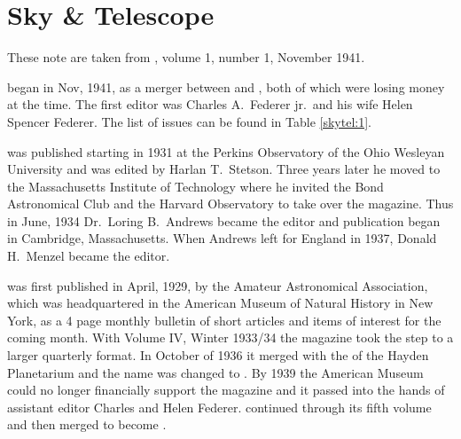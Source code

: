 \section{Sky \& Telescope}

These note are taken from , volume 1, number 1,
November 1941.

 began in Nov, 1941, as a merger between  and , both of which were losing money at the
time.  The first editor was Charles A.~Federer jr.\ and his wife Helen
Spencer Federer. The list of issues can be found in Table \ref{skytel:1}.

 was published starting in 1931 at
the Perkins Observatory of the Ohio Wesleyan University and was edited
by Harlan T.~Stetson. Three years later he moved to the Massachusetts
Institute of Technology where he invited the Bond Astronomical Club and
the Harvard Observatory to take over the magazine. Thus in June, 1934
Dr.~Loring B.~Andrews became the editor and publication began in Cambridge,
Massachusetts.  When Andrews left for England in 1937, Donald H.~Menzel
became the editor.

 was first published in April, 1929, by the
Amateur Astronomical Association, which was headquartered in the American
Museum of Natural History in New York, as a 4 page monthly bulletin of
short articles and items of interest for the coming month.  With
Volume IV, Winter 1933/34 the magazine took the step to a larger
quarterly format.  In October of 1936 it merged with the  of the Hayden Planetarium and the name was changed to
. By 1939 the American Museum could no longer financially
support the magazine and it passed into the hands of assistant
editor Charles and Helen Federer.  continued through
its fifth volume and then merged to become .

